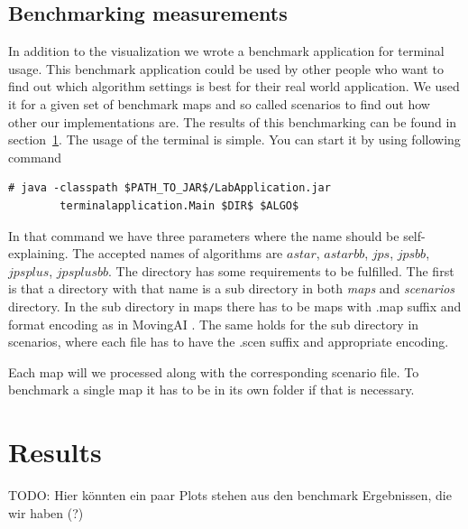 \documentclass{article}
\begin{document}
    \subsection{Benchmarking measurements}

    In addition to the visualization we wrote a benchmark application for terminal usage. This benchmark application could be used by other people who want to find out which algorithm settings is best for their real world application. We used it for a given set of benchmark maps and so called scenarios to find out how other our implementations are. The results of this benchmarking can be found in section~\ref{sec:results}. The usage of the terminal is simple. You can start it by using following command

    \begin{lstlisting}[basicstyle=\small\ttfamily]
      # java -classpath $PATH_TO_JAR$/LabApplication.jar
        terminalapplication.Main $DIR$ $ALGO$
    \end{lstlisting}

    In that command we have three parameters where the name should be self-explaining. The accepted names of algorithms are $astar$, $astarbb$, $jps$, $jpsbb$, $jpsplus$, $jpsplusbb$. The directory has some requirements to be fulfilled. The first is that a directory with that name is a sub directory in both \textit{maps} and \textit{scenarios} directory. In the sub directory in maps there has to be maps with .map suffix and format encoding as in MovingAI \cite{sturtevant2012benchmarks}. The same holds for the sub directory in scenarios, where each file has to have the .scen suffix and appropriate encoding.

    Each map will we processed along with the corresponding scenario file. To benchmark a single map it has to be in its own folder if that is necessary.



    \section{Results}
    \label{sec:results}
    TODO: Hier könnten ein paar Plots stehen aus den benchmark Ergebnissen, die wir haben (?)

    \cite{sturtevant2012benchmarks}


    
    
\end{document}

